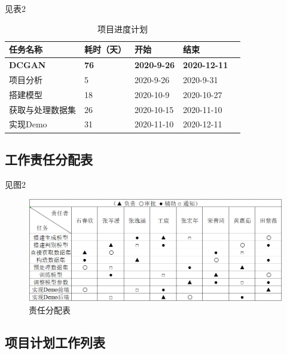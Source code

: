 \documentclass[
  hyperref, a4paper]{ctexart}
\begin{document}
见表2

\begin{table}
    \caption{项目进度计划}
    \centering
    \begin{tabular}{|p{2.0cm}<{\centering}|p{1.0cm}<{\centering}|p{2.0cm}<{\centering}|p{2.0cm}<{\centering}|p{2.0cm}<{\centering}|}
    \hline
    任务名称     & 耗时（天） & 开始         & 结束         \\ \hline
    \textbf{DCGAN}    & \textbf{76}    & \textbf{2020-9-26}  & \textbf{2020-12-11} \\ \hline
    项目分析     & 5     & 2020-9-26  & 2020-9-31  \\ \hline
    搭建模型     & 18     & 2020-10-9  & 2020-10-27 \\ \hline
    获取与处理数据集 & 26     & 2020-10-15 & 2020-11-10 \\ \hline
    实现Demo   & 31    & 2020-11-10 & 2020-12-11 \\ \hline
    \end{tabular}
\end{table}

\hypertarget{ux5de5ux4f5cux8d23ux4efbux5206ux914dux8868}{%
\subsection{工作责任分配表}\label{ux5de5ux4f5cux8d23ux4efbux5206ux914dux8868}}

见图2

\begin{figure}
\centering
\includegraphics{1.png}
\caption{责任分配表}
\end{figure}

\hypertarget{ux9879ux76eeux8ba1ux5212ux5de5ux4f5cux5217ux8868}{%
\subsection{项目计划工作列表}\label{ux9879ux76eeux8ba1ux5212ux5de5ux4f5cux5217ux8868}}
\end{document}
